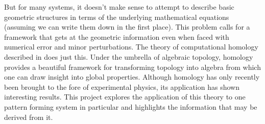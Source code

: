 	But for many systems, it doesn't make sense to attempt to describe basic geometric structures in terms of the underlying mathematical equations (assuming we can write them down in the first place). This problem calls for a framework that gets at the geometric information even when faced with numerical error and minor perturbations. The theory of computational homology described in  does just this. Under the umbrella of algebraic topology, homology provides a beautiful framework for transforming topology into algebra from which one can draw insight into global properties. Although homology has only recently been brought to the fore of experimental physics, its application has shown interesting results. This project explores the application of this theory to one pattern forming system in particular and highlights the information that may be derived from it.